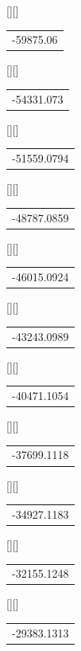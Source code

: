 %    
%
%
\begin{psfrags}%
\psfragscanon%
%
[][]{\color[rgb]{0,0,0}\setlength{\tabcolsep}{0pt}\begin{tabular}{c}-59875.06\end{tabular}}%
[][]{\color[rgb]{0,0,0}\setlength{\tabcolsep}{0pt}\begin{tabular}{c}-54331.073\end{tabular}}%
[][]{\color[rgb]{0,0,0}\setlength{\tabcolsep}{0pt}\begin{tabular}{c}-51559.0794\end{tabular}}%
[][]{\color[rgb]{0,0,0}\setlength{\tabcolsep}{0pt}\begin{tabular}{c}-48787.0859\end{tabular}}%
[][]{\color[rgb]{0,0,0}\setlength{\tabcolsep}{0pt}\begin{tabular}{c}-46015.0924\end{tabular}}%
[][]{\color[rgb]{0,0,0}\setlength{\tabcolsep}{0pt}\begin{tabular}{c}-43243.0989\end{tabular}}%
[][]{\color[rgb]{0,0,0}\setlength{\tabcolsep}{0pt}\begin{tabular}{c}-40471.1054\end{tabular}}%
[][]{\color[rgb]{0,0,0}\setlength{\tabcolsep}{0pt}\begin{tabular}{c}-37699.1118\end{tabular}}%
[][]{\color[rgb]{0,0,0}\setlength{\tabcolsep}{0pt}\begin{tabular}{c}-34927.1183\end{tabular}}%
[][]{\color[rgb]{0,0,0}\setlength{\tabcolsep}{0pt}\begin{tabular}{c}-32155.1248\end{tabular}}%
[][]{\color[rgb]{0,0,0}\setlength{\tabcolsep}{0pt}\begin{tabular}{c}-29383.1313\end{tabular}}%

\end{psfrags}
